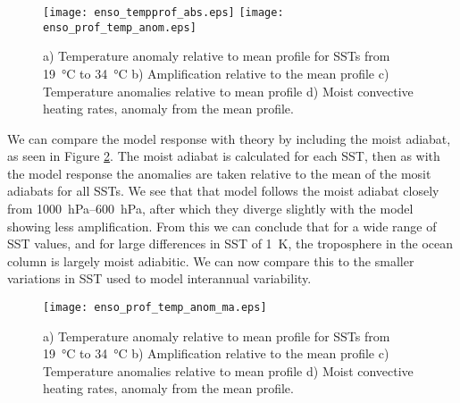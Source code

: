 \begin{figure}[ht]
\texttt{[image: enso\_tempprof\_abs.eps]}
\texttt{[image: enso\_prof\_temp\_anom.eps]}
\caption{a) Temperature anomaly relative to mean profile for SSTs from 
\SI{19}{\degreeCelsius} to \SI{34}{\degreeCelsius} b) Amplification relative to 
the mean profile c) Temperature anomalies relative to mean profile d) Moist 
convective heating rates, anomaly from the mean profile.}
\label{fig:scmsstprof_large}
\end{figure}

We can compare the model response with theory by including the moist adiabat, as 
seen in Figure \ref{fig:scmsstprof_ma}. The moist adiabat is calculated for each 
SST, then as with the model response the anomalies are taken relative to the 
mean of the mosit adiabats for all SSTs. We see that that model follows the 
moist adiabat closely from \SIrange{1000}{600}{\hecto\pascal}, after which they 
diverge slightly with the model showing less amplification. From this we can 
conclude that for a wide range of SST values, and for large differences in SST 
of \SI{1}{\kelvin}, the troposphere in the ocean column is largely moist 
adiabitic.  We can now compare this to the smaller variations in SST used to 
model interannual variability.

\begin{figure}[ht]
\texttt{[image: enso\_prof\_temp\_anom\_ma.eps]}
\caption{a) Temperature anomaly relative to mean profile for SSTs from 
\SI{19}{\degreeCelsius} to \SI{34}{\degreeCelsius} b) Amplification relative to 
the mean profile c) Temperature anomalies relative to mean profile d) Moist 
convective heating rates, anomaly from the mean profile.}
\label{fig:scmsstprof_ma}
\end{figure}


